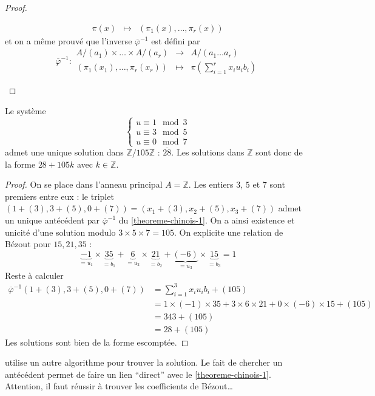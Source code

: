 \begin{proof}
\begin{enumerate}[label={\bfseries(\roman*)}]
\[\begin{array}{ccc}
          \pi(x) &\mapsto& (\pi_1(x), \dots, \pi_r(x))
        \end{array}
      \]
      et on a même prouvé que l'inverse $\overline{\varphi}^{-1}$ est défini par
      \[
      \overline{\varphi}^{-1} :
      \begin{array}{ccc}
        A/(a_1) \times \dots \times A/(a_r) &\rightarrow& A/(a_1 \dots a_r) \\
        (\pi_1(x_1), \dots, \pi_r(x_r)) &\mapsto& \pi \left( \sum_{i=1}^{r} x_i u_i b_i \right)
      \end{array}
      \]
    \end{enumerate}
  \end{proof}


  \begin{example}
    Le système
    \[
    \begin{cases}
      u \equiv 1 \mod 3 \\
      u \equiv 3 \mod 5 \\
      u \equiv 0 \mod 7
    \end{cases}
    \]
    admet une unique solution dans $\mathbb{Z}/105\mathbb{Z}$ : $\overline{28}$. Les solutions dans $\mathbb{Z}$ sont donc de la forme $28 + 105k$ avec $k \in \mathbb{Z}$.
  \end{example}

  \begin{proof}
    On se place dans l'anneau principal $A = \mathbb{Z}$. Les entiers $3$, $5$ et $7$ sont premiers entre eux : le triplet $(1 + (3), 3 + (5), 0 + (7)) = (x_1 + (3), x_2 + (5), x_3 + (7))$ admet un unique antécédent par $\overline{\varphi}^{-1}$ du \cref{theoreme-chinois-1}. On a ainsi existence et unicité d'une solution modulo $3 \times 5 \times 7 = 105$. On explicite une relation de Bézout pour $15, 21, 35$ :
    \[ \underbrace{-1}_{=u_1} \times \underbrace{35}_{=b_1} + \underbrace{6}_{=u_2} \times \underbrace{21}_{=b_2} + \underbrace{(-6)}_{=u_3} \times \underbrace{15}_{=b_3} = 1 \]
    Reste à calculer
    \begin{align*}
      \overline{\varphi}^{-1}(1 + (3), 3 + (5), 0 + (7)) &= \sum_{i=1}^3 x_i u_i b_i + (105) \\
      &= 1 \times (-1) \times 35 + 3 \times 6 \times 21 + 0 \times (-6) \times 15  + (105) \\
      &= 343 + (105) \\
      &= 28 + (105)
    \end{align*}
    Les solutions sont bien de la forme escomptée.
  \end{proof}

  \cite{[ULM18]} utilise un autre algorithme pour trouver la solution. Le fait de chercher un antécédent permet de faire un lien ``direct'' avec le \cref{theoreme-chinois-1}. Attention, il faut réussir à trouver les coefficients de Bézout\dots

